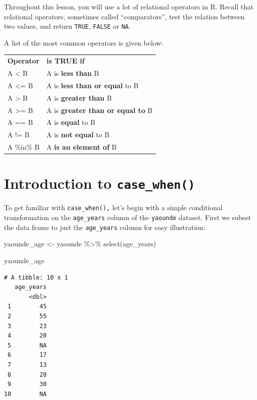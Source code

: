 \documentclass[
  letterpaper,
  DIV=11,
  numbers=noendperiod]{scrreprt}
\newenvironment{Shaded}{\begin{snugshade}}{\end{snugshade}}
\newcommand{\FunctionTok}[1]{\textcolor[rgb]{0.28,0.35,0.67}{#1}}
\newcommand{\NormalTok}[1]{\textcolor[rgb]{0.00,0.23,0.31}{#1}}
\newcommand{\OtherTok}[1]{\textcolor[rgb]{0.00,0.23,0.31}{#1}}
\newcommand{\SpecialCharTok}[1]{\textcolor[rgb]{0.37,0.37,0.37}{#1}}
\begin{document}
Throughout this lesson, you will use a lot of relational operators in R.
Recall that relational operators, sometimes called ``comparators'', test
the relation between two values, and return \texttt{TRUE},
\texttt{FALSE} or \texttt{NA}.

A list of the most common operators is given below:

\begin{longtable}[]{@{}ll@{}}
\toprule\noalign{}
\endhead
\bottomrule\noalign{}
\endlastfoot
\textbf{Operator} & \textbf{is TRUE if} \\
A \textless{} B & A is \textbf{less than} B \\
A \textless= B & A is \textbf{less than or equal} to B \\
A \textgreater{} B & A is \textbf{greater than} B \\
A \textgreater= B & A is \textbf{greater than or equal to} B \\
A == B & A is \textbf{equal} to B \\
A != B & A is \textbf{not equal} to B \\
A \%in\% B & A \textbf{is an element of} B \\
\end{longtable}

\section{\texorpdfstring{Introduction to
\texttt{case\_when()}}{Introduction to case\_when()}}\label{introduction-to-case_when}

To get familiar with \texttt{case\_when(),} let's begin with a simple
conditional transformation on the \texttt{age\_years} column of the
\texttt{yaounde} dataset. First we subset the data frame to just the
\texttt{age\_years} column for easy illustration:

\begin{Shaded}
\begin{Highlighting}[]
\NormalTok{yaounde\_age }\OtherTok{\textless{}{-}} 
\NormalTok{  yaounde }\SpecialCharTok{\%\textgreater{}\%} 
  \FunctionTok{select}\NormalTok{(age\_years)}

\NormalTok{yaounde\_age}
\end{Highlighting}
\end{Shaded}

\begin{verbatim}
# A tibble: 10 x 1
   age_years
       <dbl>
 1        45
 2        55
 3        23
 4        20
 5        NA
 6        17
 7        13
 8        28
 9        30
10        NA
\end{verbatim}
\end{document}
